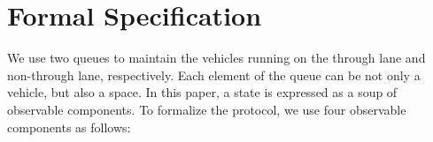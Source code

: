 \documentclass[10pt, conference, compsocconf]{IEEEtran}
\begin{document}
\section{Formal Specification}
 \label{sect_formal}
We use two queues to maintain the vehicles running on the through lane and non-through lane, respectively.
Each element of the queue can be not only a vehicle, but also a space.
In this paper, a state is expressed as a soup of observable components.
To formalize the protocol, we use four observable components as follows:
\end{document}
